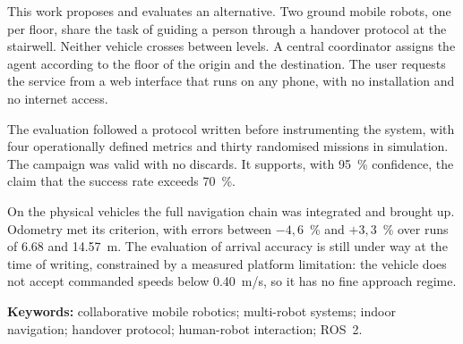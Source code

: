 This work proposes and evaluates an alternative. Two ground mobile robots, one
per floor, share the task of guiding a person through a handover protocol at the
stairwell. Neither vehicle crosses between levels. A central coordinator assigns
the agent according to the floor of the origin and the destination. The user
requests the service from a web interface that runs on any phone, with no
installation and no internet access.

The evaluation followed a protocol written before instrumenting the system, with
four operationally defined metrics and thirty randomised missions in simulation.
The campaign was valid with no discards. It supports, with 95~\% confidence, the
claim that the success rate exceeds 70~\%.

On the physical vehicles the full navigation chain was integrated and brought
up. Odometry met its criterion, with errors between $-4{,}6$~\% and $+3{,}3$~\%
over runs of 6.68 and 14.57~m. The evaluation of arrival accuracy is still under
way at the time of writing, constrained by a measured platform limitation: the
vehicle does not accept commanded speeds below 0.40~m/s, so it has no fine
approach regime.

\vspace{1em}
\textbf{Keywords:} collaborative mobile robotics; multi-robot systems; indoor
navigation; handover protocol; human-robot interaction; ROS~2.
